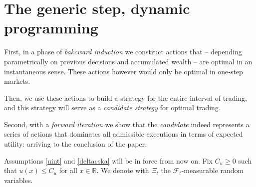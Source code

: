 \documentclass[a4paper]{article}
\begin{document}
\section{The generic step, dynamic programming}\label{dyna}

First, in a phase of \emph{bakcward induction} we construct actions that -- depending parametrically on 
previous decisions and accumulated wealth -- are optimal in an instantaneous sense. These actions however would 
only be optimal in one-step markets. 

Then, we use these actions to build a strategy for the entire interval of trading, and this strategy 
will serve as a \emph{candidate strategy} for optimal trading. 

Second, with a \emph{forward iteration} we show that the \emph{candidate} indeed represents a 
series of actions that dominates all admissible executions in terms of expected utility: arriving to the conclusion of the paper. 

Assumptions \ref{uint} and \ref{deltacska} will be in force from now on. Fix $C_{u}\geq 0$ such that $u(x)\leq C_{u}$ for
all $x\in\mathbb{R}$. We denote with $\Xi_{t}$ the $\mathcal{F}_{t}$-measurable random variables.
\end{document}
